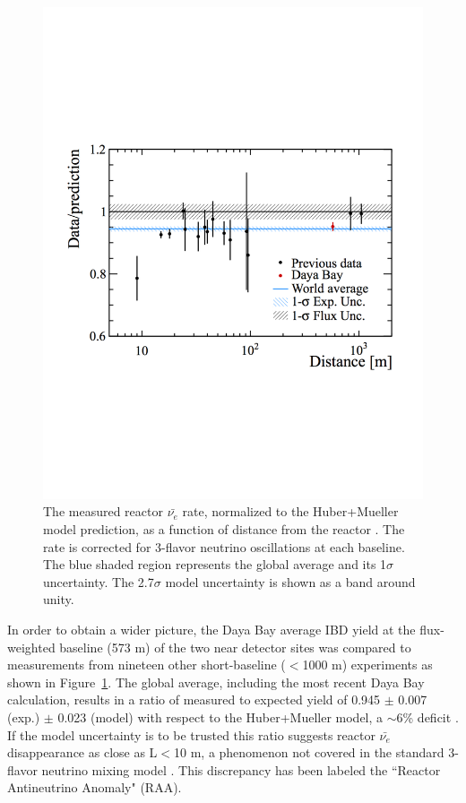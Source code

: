 \begin{figure}[!t]
	\centering
	\includegraphics[width=0.6\linewidth]{tex/3-reactorneutrinos-images/WorldAvgFlux}
	\caption[World average of reactor $\bar{\nu_{e}}$ flux. ]{The measured reactor $\bar{\nu_{e}}$ rate, normalized to the Huber+Mueller model prediction, as a function of distance from the reactor \cite{DayaBayFlux2018}. The rate is corrected for 3-flavor neutrino oscillations at each baseline. The blue shaded region represents the global average and its 1$\sigma$ uncertainty. The 2.7$\sigma$ model uncertainty is shown as a band around unity.}
	\label{fig:worldavgflux}
\end{figure}

In order to obtain a wider picture, the Daya Bay average IBD yield at the flux-weighted baseline (573 m) of the two near detector sites was compared to measurements from nineteen other short-baseline ($<$1000 m) experiments as shown in Figure~\ref{fig:worldavgflux}. 
The global average, including the most recent Daya Bay calculation, results in a ratio of measured to expected yield of 0.945 $\pm$ 0.007 (exp.) $\pm$ 0.023 (model) with respect to the Huber+Mueller model, a $\sim$6\% deficit \cite{DayaBayFlux2018}.
If the model uncertainty is to be trusted this ratio suggests reactor $\bar{\nu_{e}}$ disappearance as close as L$<$10 m, a phenomenon not covered in the standard 3-flavor neutrino mixing model \cite{HayesVogel}.  
This discrepancy has been labeled the ``Reactor Antineutrino Anomaly" (RAA). 

